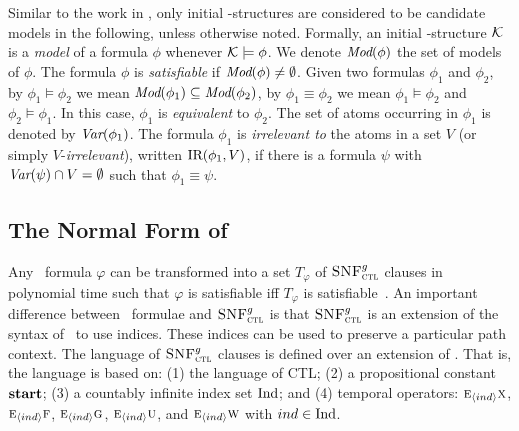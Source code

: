 \documentclass[letterpaper]{article} %
\begin{document}
Similar to the work in \cite{browne1988characterizing,Bolotov:1999:JETAI},
only initial \MPK-structures are considered to be candidate models
in the following, unless otherwise noted. Formally,
an initial \MPK-structure $\cal K$ is a {\em model} of a formula $\phi$
whenever ${\cal K}\models\phi$.
We denote $\textit{Mod}(\phi)$ the set of models of $\phi$.
The formula
$\phi$  is {\em satisfiable}
if $\textit{Mod}(\phi)\neq\emptyset$.
Given two formulas $\phi_1$ and $\phi_2$,  by $\phi_1\models\phi_2$ we mean $\textit{Mod}(\phi_1)\subseteq\textit{Mod}(\phi_2)$, by $\phi_1\equiv\phi_2$ we mean $\phi_1\models\phi_2$ and $\phi_2\models\phi_1$.
In this case, $\phi_1$ is {\em equivalent} to $\phi_2$.
The set of atoms occurring in $\phi_1$ is denoted by $\textit{Var}(\phi_1)$.
The formula $\phi_1$ is {\em irrelevant to} the atoms in a set $V$ (or simply $V$-{\em irrelevant}), written $\textrm{IR}(\phi_1,V)$,
if there is a formula $\psi$ with
$\textit{Var}(\psi)\cap V=\emptyset$ such that $\phi_1\equiv\psi$.


\subsection{The Normal Form of \CTL}
Any \CTL\ formula $\varphi$ can be transformed into a set $T_\varphi$ of ${\textsc{SNF}_{\textsc{ctl}}^g}$ clauses in polynomial time such that $\varphi$ is satisfiable iff $T_\varphi$ is satisfiable~\cite{zhang2008first}.
An important difference between \CTL\ formulae and ${\textsc{SNF}_{\textsc{ctl}}^g}$ is that ${\textsc{SNF}_{\textsc{ctl}}^g}$ is an extension of the syntax of \CTL\ to use indices. These indices can be used to preserve a particular path context. The language of ${\textsc{SNF}_{\textsc{ctl}}^g}$ clauses is defined over an extension of \CTL. That is, the language is based on: (1) the language of CTL; (2) a propositional constant $\textbf{start}$; (3) a countably infinite index set $\textrm{Ind}$; and (4) temporal operators: $\textsc{e}_{{\langle{ind}\rangle}} \textsc{x}$, $\textsc{e}_{{\langle{ind}\rangle}} \textsc{f}$, $\textsc{e}_{{\langle{ind}\rangle}} \textsc{g}$, $\textsc{e}_{{\langle{ind}\rangle}} \textsc{u}$, and $\textsc{e}_{{\langle{ind}\rangle}} \textsc{w}$  with $ind \in \textrm{Ind}$.
\end{document}

